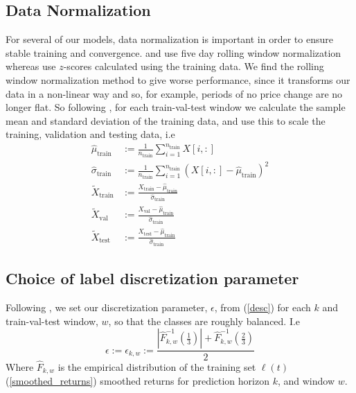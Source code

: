 \documentclass[a4paper, oneside, notitlepage]{book}
\begin{document}
\subsection{Data Normalization}
For several of our models, data normalization is important in order to ensure stable training
and convergence. \cite{LUCCHESE2024} and \cite{ZHANG2019} use five day rolling window normalization
whereas \cite{KOLM2023} use $z$-scores calculated using the training data.
We find the rolling window normalization method to give worse performance, since it transforms
our data in a non-linear way and so, for example, periods of no price change are
no longer flat. So following \cite{KOLM2023}, for each train-val-test window we calculate the 
sample mean and standard deviation of the training data, and use this to scale the training,
validation and testing data, i.e 
\begin{equation}
    \begin{aligned}
        \hat{\mu}_{\text{train}} &:= \frac{1}{n_{\text{train}}} \sum_{i=1}^{n_{\text{train}}} X[i, :] \\
        \hat{\sigma}_{\text{train}} &:= \frac{1}{n_{\text{train}}} \sum_{i=1}^{n_{\text{train}}} (X[i, :] - \hat{\mu}_{\text{train}})^2 \\
        \tilde{X}_{\text{train}} &:= \frac{X_{\text{train}} - \hat{\mu}_{\text{train}}}{\hat{\sigma}_{\text{train}}} \\
        \tilde{X}_{\text{val}} &:= \frac{X_{\text{val}} - \hat{\mu}_{\text{train}}}{\hat{\sigma}_{\text{train}}} \\
        \tilde{X}_{\text{test}} &:= \frac{X_{\text{test}} - \hat{\mu}_{\text{train}}}{\hat{\sigma}_{\text{train}}}
    \end{aligned}
\end{equation}

\subsection{Choice of label discretization parameter}
Following \cite{LUCCHESE2024}, we set our discretization parameter, $\epsilon$, from (\ref{desc})
for each $k$ and train-val-test window, $w$, so that the classes are roughly balanced. I.e
\begin{equation}
    \epsilon := \epsilon_{k, w} := \frac{|\hat{F}_{k, w}^{-1}(\frac{1}{3})| + \hat{F}_{k, w}^{-1}(\frac{2}{3})}{2}
\end{equation}
Where $\hat{F}_{k, w}$ is the empirical distribution of the training set $\ell(t)$ (\ref{smoothed_returns}) smoothed returns 
for prediction horizon $k$, and window $w$.
\end{document}
